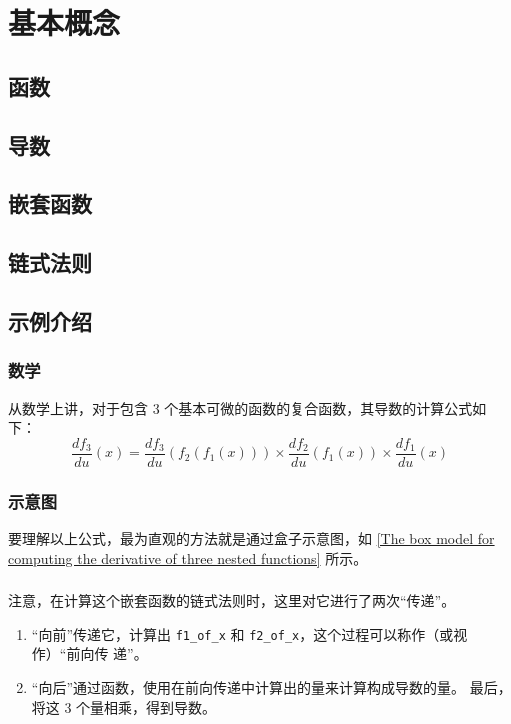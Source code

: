 \chapter{基本概念}
\section{函数}
\section{导数}
\section{嵌套函数}
\section{链式法则}
\section{示例介绍}
\subsection*{数学}
从数学上讲，对于包含 3 个基本可微的函数的复合函数，其导数的计算公式如下：
\begin{equation*}
    \frac{df_3}{du}(x)=\frac{df_3}{du}(f_2(f_1(x)))\times\frac{df_2}{du}(f_1(x))\times\frac{df_1}{du}(x)
\end{equation*}
\subsection*{示意图}
要理解以上公式，最为直观的方法就是通过盒子示意图，如 \autoref{The box model for computing the derivative of three nested functions} 所示。
\subsection*{}
注意，在计算这个嵌套函数的链式法则时，这里对它进行了两次“传递”。
\begin{enumerate}
    \item “向前”传递它，计算出 \verb|f1_of_x| 和 \verb|f2_of_x|，这个过程可以称作（或视作）“前向传
          递”。
    \item “向后”通过函数，使用在前向传递中计算出的量来计算构成导数的量。
          最后，将这 3 个量相乘，得到导数。
\end{enumerate}
